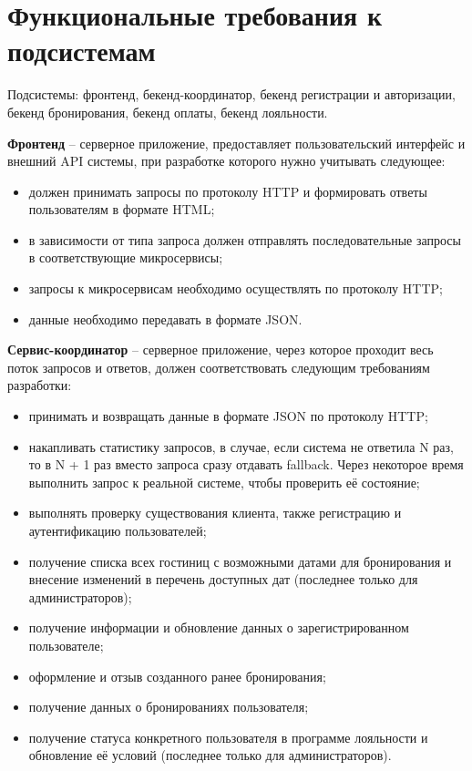 \section*{Функциональные требования к подсистемам}
Подсистемы: фронтенд, бекенд-координатор, бекенд регистрации и авторизации, бекенд бронирования, бекенд оплаты, бекенд лояльности.

\textbf{Фронтенд} -- серверное  приложение, предоставляет пользовательский интерфейс и внешний API системы, при  разработке которого нужно учитывать следующее:
\begin{itemize}
	\item должен  принимать  запросы  по  протоколу  HTTP и формировать ответы пользователям в формате HTML;
	
	\item в зависимости от типа запроса должен отправлять последовательные запросы в соответствующие микросервисы;
	
	\item запросы к микросервисам необходимо осуществлять по протоколу HTTP;
	
	\item данные необходимо передавать в формате JSON.
\end{itemize}

\textbf{Сервис-координатор} -- серверное приложение, через которое проходит весь поток запросов и ответов, должен соответствовать следующим требованиям разработки:
\begin{itemize}
	\item принимать и возвращать данные в формате JSON по протоколу HTTP;
	
	\item накапливать статистику запросов, в случае, если система не ответила N раз, то в N + 1 раз вместо запроса сразу отдавать fallback. Через некоторое время выполнить запрос к реальной системе, чтобы проверить её состояние;
	
	\item выполнять проверку существования клиента, также регистрацию и аутентификацию пользователей;
	
	\item получение списка всех гостиниц с возможными датами для бронирования и внесение изменений в перечень доступных дат (последнее только для администраторов);
	
	\item получение информации и обновление данных о зарегистрированном пользователе;
	
	\item оформление и отзыв созданного ранее бронирования;
		
	\item получение данных о бронированиях пользователя;
	
	\item получение статуса конкретного пользователя в программе лояльности и обновление её условий (последнее только для администраторов).
\end{itemize}

